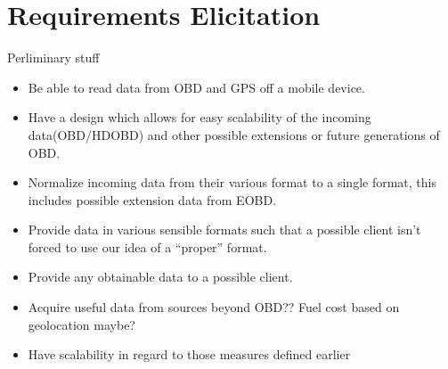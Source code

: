 \section{Requirements Elicitation}\label{sec:requirements_elicitation}
Perliminary stuff
\begin{itemize}
    \item Be able to read data from \ac{OBD} and GPS off a mobile device.
    \item Have a design which allows for easy scalability of the incoming data(OBD/HDOBD) and other possible extensions or future generations of OBD.
    \item Normalize incoming data from their various format to a single format, this includes possible extension data from EOBD.
    \item Provide data in various sensible formats such that a possible client isn't forced to use our idea of a ``proper'' format.
    \item Provide any obtainable data to a possible client.
    \item Acquire useful data from sources beyond OBD?? Fuel cost based on geolocation maybe?
    \item Have scalability in regard to those measures defined earlier
\end{itemize}
